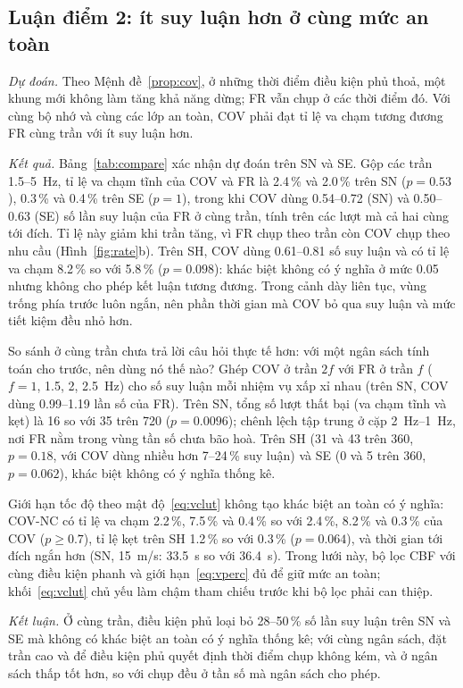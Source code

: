 \documentclass[11pt,a4paper]{article}
\theoremstyle{plain}
\theoremstyle{definition}
\theoremstyle{remark}
\begin{document}
\subsection{Luận điểm 2: ít suy luận hơn ở cùng mức an toàn}\label{sec:r2}

\emph{Dự đoán.} Theo Mệnh đề~\ref{prop:cov}, ở những thời điểm điều kiện phủ thoả, một khung mới không làm tăng khả năng dừng; FR vẫn chụp ở các thời điểm đó. Với cùng bộ nhớ và cùng các lớp an toàn, COV phải đạt tỉ lệ va chạm tương đương FR cùng trần với ít suy luận hơn.

\emph{Kết quả.} Bảng~\ref{tab:compare} xác nhận dự đoán trên SN và SE. Gộp các trần 1.5--5~Hz, tỉ lệ va chạm tĩnh của COV và FR là 2.4\,\% và 2.0\,\% trên SN ($p = 0.53$), 0.3\,\% và 0.4\,\% trên SE ($p = 1$), trong khi COV dùng 0.54--0.72 (SN) và 0.50--0.63 (SE) số lần suy luận của FR ở cùng trần, tính trên các lượt mà cả hai cùng tới đích. Tỉ lệ này giảm khi trần tăng, vì FR chụp theo trần còn COV chụp theo nhu cầu (Hình~\ref{fig:rate}b). Trên SH, COV dùng 0.61--0.81 số suy luận và có tỉ lệ va chạm 8.2\,\% so với 5.8\,\% ($p = 0.098$): khác biệt không có ý nghĩa ở mức 0.05 nhưng không cho phép kết luận tương đương. Trong cảnh dày liên tục, vùng trống phía trước luôn ngắn, nên phần thời gian mà COV bỏ qua suy luận và mức tiết kiệm đều nhỏ hơn.

So sánh ở cùng trần chưa trả lời câu hỏi thực tế hơn: với một ngân sách tính toán cho trước, nên dùng nó thế nào? Ghép COV ở trần $2f$ với FR ở trần $f$ ($f = 1$, 1.5, 2, 2.5~Hz) cho số suy luận mỗi nhiệm vụ xấp xỉ nhau (trên SN, COV dùng 0.99--1.19 lần số của FR). Trên SN, tổng số lượt thất bại (va chạm tĩnh và kẹt) là 16 so với 35 trên 720 ($p = 0.0096$); chênh lệch tập trung ở cặp 2~Hz--1~Hz, nơi FR nằm trong vùng tần số chưa bão hoà. Trên SH (31 và 43 trên 360, $p = 0.18$, với COV dùng nhiều hơn 7--24\,\% suy luận) và SE (0 và 5 trên 360, $p = 0.062$), khác biệt không có ý nghĩa thống kê.

Giới hạn tốc độ theo mật độ~\eqref{eq:vclut} không tạo khác biệt an toàn có ý nghĩa: COV-NC có tỉ lệ va chạm 2.2\,\%, 7.5\,\% và 0.4\,\% so với 2.4\,\%, 8.2\,\% và 0.3\,\% của COV ($p \ge 0.7$), tỉ lệ kẹt trên SH 1.2\,\% so với 0.3\,\% ($p = 0.064$), và thời gian tới đích ngắn hơn (SN, 15~m/s: 33.5~s so với 36.4~s). Trong lưới này, bộ lọc CBF với cùng điều kiện phanh và giới hạn~\eqref{eq:vperc} đủ để giữ mức an toàn; khối~\eqref{eq:vclut} chủ yếu làm chậm tham chiếu trước khi bộ lọc phải can thiệp.

\emph{Kết luận.} Ở cùng trần, điều kiện phủ loại bỏ 28--50\,\% số lần suy luận trên SN và SE mà không có khác biệt an toàn có ý nghĩa thống kê; với cùng ngân sách, đặt trần cao và để điều kiện phủ quyết định thời điểm chụp không kém, và ở ngân sách thấp tốt hơn, so với chụp đều ở tần số mà ngân sách cho phép.
\end{document}
